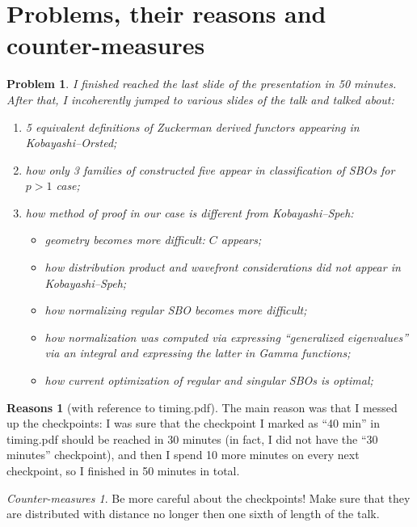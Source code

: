 \documentclass[12pt]{article} %
\theoremstyle{theorem}
\newtheorem{problem}{Problem}
\theoremstyle{definition}
\newtheorem{reason}{Reasons}
\theoremstyle{remark}
\newtheorem{countermeasure}{Counter-measures}
\begin{document}
\section{Problems, their reasons and counter-measures}
\begin{problem}
    I finished reached the last slide of the presentation in 50 minutes.
    After that, I incoherently jumped to various slides of the talk and talked about:\begin{enumerate}
        \item 5 equivalent definitions of Zuckerman derived functors appearing in Kobayashi--Orsted;
        \item how only 3 families of constructed five appear in classification of SBOs for $p>1$ case;
        \item how method of proof in our case is different from Kobayashi--Speh:\begin{itemize}
                \item geometry becomes more difficult: $C$
            appears;
                \item  how distribution product and wavefront considerations did not appear in Kobayashi--Speh;
                \item how normalizing regular SBO becomes more difficult;
                \item how normalization was computed via expressing ``generalized eigenvalues'' via an integral
                    and expressing the latter in Gamma functions;
                \item how current optimization of regular and singular SBOs is optimal;
            \end{itemize}
    \end{enumerate}
\end{problem}
\begin{reason}[with reference to {\ttfamily timing.pdf}]
    The main reason was that I messed up the checkpoints: I was sure that the checkpoint I marked as ``40 min''
    in {\ttfamily timing.pdf} should be reached in 30 minutes (in fact,
    I did not have the ``30 minutes'' checkpoint), and then I spend 10 more minutes on every next checkpoint,
    so I finished in 50 minutes in total.
\end{reason}
\begin{countermeasure}
    Be more careful about the checkpoints! Make sure that they are distributed with distance no longer then
    one sixth of length of the talk.
\end{countermeasure}
\end{document}
